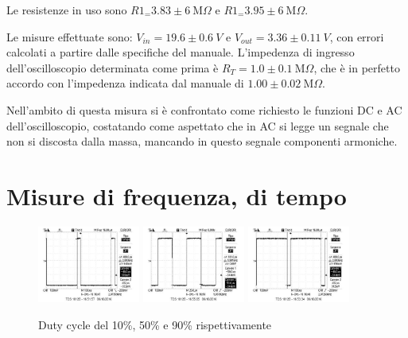 \documentclass[10pt,a4paper]{article}
\begin{document}
Le resistenze in uso sono $R1_=3.83 \pm 6~\text{M}\Omega$ e  $R1_=3.95 \pm 6~\text{M}\Omega$.

Le misure effettuate sono: $V_{in}=19.6 \pm 0.6 ~V$ e $V_{out}= 3.36 \pm 0.11 ~ V$, con errori calcolati a partire dalle specifiche del manuale. L'impedenza di ingresso dell'oscilloscopio determinata come prima è $R_T=1.0 \pm 0.1 ~ \text{M}\Omega$, che è in perfetto accordo con l'impedenza indicata dal manuale di $1.00 \pm 0.02 ~\text{M} \Omega$.

Nell'ambito di questa misura si è confrontato come richiesto le funzioni DC e AC dell'oscilloscopio, costatando come aspettato che in AC si legge un segnale che non si discosta dalla massa, mancando in questo segnale componenti armoniche.

\section{Misure di frequenza, di tempo}



\begin{figure}[h]
	\centering
	\includegraphics[width=0.3\textwidth]{../Oscilloscopio/10percento.jpg}
	\includegraphics[width=0.3\textwidth]{../Oscilloscopio/50percento.jpg}
	\includegraphics[width=0.3\textwidth]{../Oscilloscopio/90percento.jpg}
	\caption{Duty cycle del 10\%, 50\% e 90\% rispettivamente}
	\label{f:duty}
\end{figure}
\end{document}
